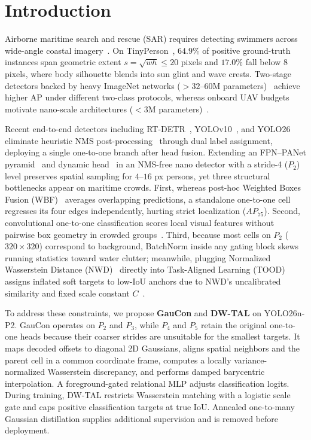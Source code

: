 \documentclass[10pt,twocolumn,letterpaper]{article}
\begin{document}
\section{Introduction}
\label{sec:intro}

Airborne maritime search and rescue (SAR) requires detecting swimmers across wide-angle coastal imagery~\cite{yu2020tinyperson,zhu2021visdrone,wang2020aitod}. On TinyPerson~\cite{yu2020tinyperson}, $64.9\%$ of positive ground-truth instances span geometric extent $s = \sqrt{wh} \le 20$ pixels and $17.0\%$ fall below $8$ pixels, where body silhouette blends into sun glint and wave crests. Two-stage detectors backed by heavy ImageNet networks ($>32\text{--}60$M parameters)~\cite{ren2015faster,lin2017focal,tian2019fcos,cai2019cascade,hong2022sspnet} achieve higher AP under different two-class protocols, whereas onboard UAV budgets motivate nano-scale architectures ($<3$M parameters)~\cite{chao2025bpdyolo}.

Recent end-to-end detectors including RT-DETR~\cite{zhao2024rtdetr}, YOLOv10~\cite{wang2024yolov10}, and YOLO26~\cite{ultralytics2026yolo} eliminate heuristic NMS post-processing~\cite{neubeck2006nms,bodla2017softnms} through dual label assignment, deploying a single one-to-one branch after head fusion. Extending an FPN--PANet pyramid~\cite{lin2017fpn,liu2018panet} and dynamic head~\cite{dai2021dyhead} in an NMS-free nano detector with a stride-4 ($P_2$) level preserves spatial sampling for $4\text{--}16$ px persons, yet three structural bottlenecks appear on maritime crowds. First, whereas post-hoc Weighted Boxes Fusion (WBF)~\cite{solovyev2021wbf} averages overlapping predictions, a standalone one-to-one cell regresses its four edges independently, hurting strict localization ($AP_{75}$). Second, convolutional one-to-one classification scores local visual features without pairwise box geometry in crowded groups~\cite{sun2021onenet,hosang2017learning}. Third, because most cells on $P_2$ ($320\times 320$) correspond to background, BatchNorm inside any gating block skews running statistics toward water clutter; meanwhile, plugging Normalized Wasserstein Distance (NWD)~\cite{wang2021nwd,xu2022nwd_isprs} directly into Task-Aligned Learning (TOOD)~\cite{feng2021tood} assigns inflated soft targets to low-IoU anchors due to NWD's uncalibrated similarity and fixed scale constant $C$~\cite{zhang2021varifocalnet}.

To address these constraints, we propose \textbf{GauCon} and \textbf{DW-TAL} on YOLO26n-P2. GauCon operates on $P_2$ and $P_3$, while $P_4$ and $P_5$ retain the original one-to-one heads because their coarser strides are unsuitable for the smallest targets. It maps decoded offsets to diagonal 2D Gaussians, aligns spatial neighbors and the parent cell in a common coordinate frame, computes a locally variance-normalized Wasserstein discrepancy, and performs damped barycentric interpolation. A foreground-gated relational MLP adjusts classification logits. During training, DW-TAL restricts Wasserstein matching with a logistic scale gate and caps positive classification targets at true IoU. Annealed one-to-many Gaussian distillation supplies additional supervision and is removed before deployment.
\end{document}
